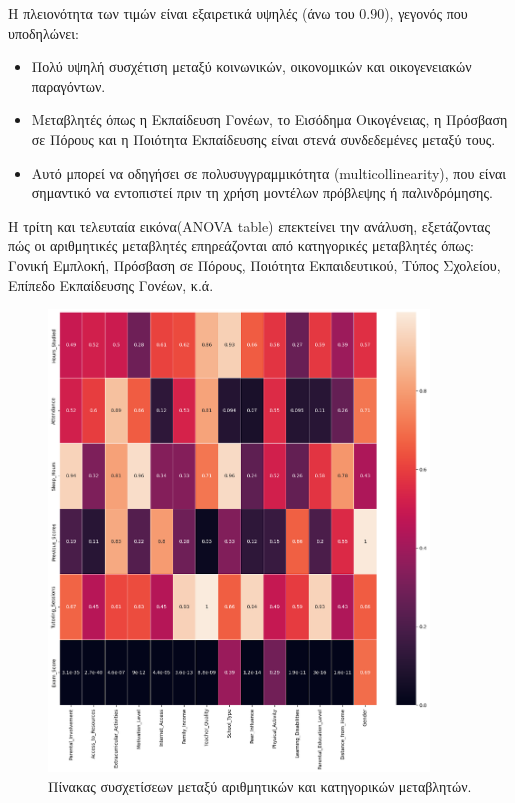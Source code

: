 \documentclass[12pt]{article}
\begin{document}
\noindent Η πλειονότητα των τιμών είναι εξαιρετικά υψηλές (άνω του $0.90$), γεγονός που υποδηλώνει:

\begin{itemize}
    \item Πολύ υψηλή συσχέτιση μεταξύ κοινωνικών, οικονομικών και οικογενειακών παραγόντων.
    \item Μεταβλητές όπως η Εκπαίδευση Γονέων, το Εισόδημα Οικογένειας, η Πρόσβαση σε Πόρους και η Ποιότητα Εκπαίδευσης είναι στενά συνδεδεμένες μεταξύ τους.
    \item Αυτό μπορεί να οδηγήσει σε πολυσυγγραμμικότητα (multicollinearity), που είναι σημαντικό να εντοπιστεί πριν τη χρήση μοντέλων πρόβλεψης ή παλινδρόμησης.
\end{itemize}

Η τρίτη και τελευταία εικόνα(ANOVA table) επεκτείνει την ανάλυση, εξετάζοντας πώς οι αριθμητικές μεταβλητές επηρεάζονται από κατηγορικές μεταβλητές όπως: Γονική Εμπλοκή, Πρόσβαση σε Πόρους, Ποιότητα Εκπαιδευτικού, Τύπος Σχολείου, Επίπεδο Εκπαίδευσης Γονέων, κ.ά.

\begin{figure}
    \centering 
    \includegraphics[width=0.9\textwidth]{./images/cat_arithmetic_rel.png}
    \caption{Πίνακας συσχετίσεων μεταξύ αριθμητικών και κατηγορικών μεταβλητών.}
    \label{fig:categorical_arithm_corr}    
\end{figure}
\end{document}
